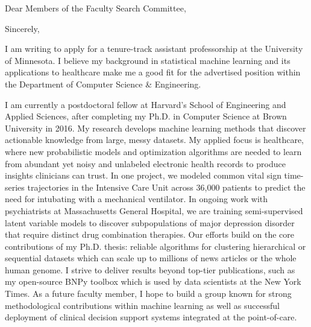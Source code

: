 \documentclass[11pt,letterpaper,roman]{moderncv}        %
\begin{document}
\date{\today}
\opening{Dear Members of the Faculty Search Committee,}
\closing{Sincerely,}

\makelettertitle

I am writing to apply for a tenure-track assistant professorship at the University of Minnesota. I believe my background in statistical machine learning and its applications to healthcare make me a good fit for the advertised position within the Department of Computer Science \& Engineering.

I am currently a postdoctoral fellow at Harvard's School of Engineering and Applied Sciences, after completing my Ph.D. in Computer Science at Brown University in 2016.
My research develops machine learning methods
that discover actionable knowledge from large, messy datasets. 
My applied focus is healthcare, where new probabilistic models and optimization algorithms are needed to learn from abundant yet noisy and unlabeled electronic health records to produce insights clinicians can trust.
In one project, we modeled common vital sign time-series trajectories in the Intensive Care Unit across 36,000 patients to predict the need for intubating with a mechanical ventilator. In ongoing work with psychiatrists at Massachusetts General Hospital, we are training semi-supervised latent variable models to discover subpopulations of major depression disorder that require distinct drug combination therapies. Our efforts build on the core contributions of my Ph.D. thesis: reliable algorithms for clustering hierarchical or sequential datasets which can scale up to millions of news articles or the whole human genome.
I strive to deliver results beyond top-tier publications, such as my open-source BNPy toolbox which is used by data scientists at the New York Times. As a future faculty member, I hope to build a group known for strong methodological contributions within machine learning as well as successful deployment of clinical decision support systems integrated at the point-of-care.
\end{document}
